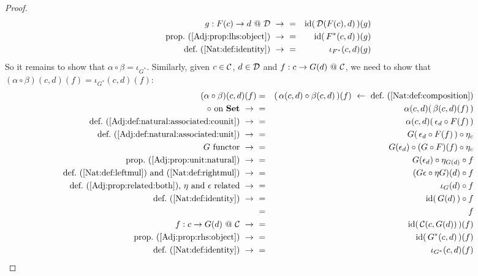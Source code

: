 \begin{proof}
\begin{eqnarray*}
            \mbox{$g:F(c)\to d\ @\ \Dat$}\ \to\ 
            &=&\id(\,\Dat(F(c),d)\,)(g)\\
            \mbox{prop.~(\ref{Adj:prop:lhs:object})}\ \to\ 
            &=&\id(\,F^{*}(c,d)\,)(g)\\
            \mbox{def.~(\ref{Nat:def:identity})}\ \to\ 
            &=&\iota_{F^{*}}(c,d)(g)\\
        \end{eqnarray*} 
    So it remains to show that $\alpha\circ\beta=\iota_{G^{*}}$. Similarly,
    given $c\in\mbox{$\cal C$}$, $d\in\mbox{$\cal D$}$ and $f:c\to G(d)\ @\ \mbox{$\cal C$}$, we need to 
    show that $(\alpha\circ\beta)(c,d)(f)=\iota_{G^{*}}(c,d)(f)$:
        \begin{eqnarray*}(\alpha\circ\beta)(c,d)(f)
            &=&(\,\alpha(c,d)\circ\beta(c,d)\,)(f)
            \ \leftarrow\ \mbox{def.~(\ref{Nat:def:composition})}\\
            \mbox{$\circ$ on \Set}\ \to\ 
            &=&\alpha(c,d)(\,\beta(c,d)(f)\,)\\
            \mbox{def.~(\ref{Adj:def:natural:associated:counit})}\ \to\ 
            &=&\alpha(c,d)(\,\epsilon_{d}\circ F(f)\,)\\
            \mbox{def.~(\ref{Adj:def:natural:associated:unit})}\ \to\ 
            &=&G(\,\epsilon_{d}\circ F(f)\,)\circ\eta_{c}\\
            \mbox{$G$ functor}\ \to\ 
            &=&G(\epsilon_{d})\circ(G\circ F)(f)\circ\eta_{c}\\
            \mbox{prop.~(\ref{Adj:prop:unit:natural})}\ \to\ 
            &=&G(\epsilon_{d})\circ\eta_{G(d)}\circ f\\
            \mbox{def.~(\ref{Nat:def:leftmul}) and~(\ref{Nat:def:rightmul})}\ \to\ 
            &=&(G\epsilon\circ\eta G)(d)\circ f\\
            \mbox{def.~(\ref{Adj:prop:related:both}), $\eta$ and 
            $\epsilon$ related}\ \to\ 
            &=&\iota_{G}(d)\circ f\\
            \mbox{def.~(\ref{Nat:def:identity})}\ \to\ 
            &=&\id(\,G(d)\,)\circ f\\
            &=&f\\
            \mbox{$f:c\to G(d)\ @\ \Cat$}\ \to\ 
            &=&\id(\,\Cat(c,G(d))\,)(f)\\
            \mbox{prop.~(\ref{Adj:prop:rhs:object})}\ \to\ 
            &=&\id(\,G^{*}(c,d)\,)(f)\\
            \mbox{def.~(\ref{Nat:def:identity})}\ \to\ 
            &=&\iota_{G^{*}}(c,d)(f)\\
        \end{eqnarray*} 
\end{proof}

